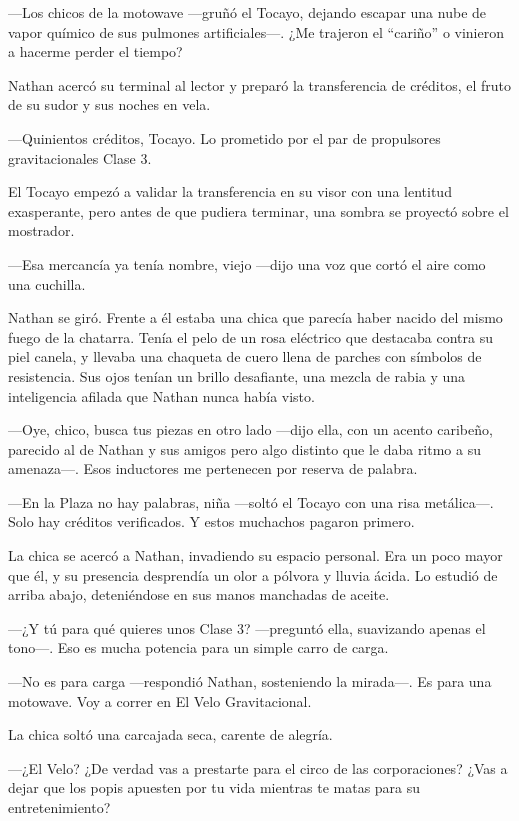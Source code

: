 \documentclass[12pt,a4paper]{book}
\begin{document}
---Los chicos de la motowave ---gruñó el Tocayo, dejando escapar una nube de vapor químico de sus pulmones artificiales---. ¿Me trajeron el ``cariño'' o vinieron a hacerme perder el tiempo?

Nathan acercó su terminal al lector y preparó la transferencia de créditos, el fruto de su sudor y sus noches en vela.

---Quinientos créditos, Tocayo. Lo prometido por el par de propulsores gravitacionales Clase 3.

El Tocayo empezó a validar la transferencia en su visor con una lentitud exasperante, pero antes de que pudiera terminar, una sombra se proyectó sobre el mostrador.

---Esa mercancía ya tenía nombre, viejo ---dijo una voz que cortó el aire como una cuchilla.

Nathan se giró. Frente a él estaba una chica que parecía haber nacido del mismo fuego de la chatarra. Tenía el pelo de un rosa eléctrico que destacaba contra su piel canela, y llevaba una chaqueta de cuero llena de parches con símbolos de resistencia. Sus ojos tenían un brillo desafiante, una mezcla de rabia y una inteligencia afilada que Nathan nunca había visto.

---Oye, chico, busca tus piezas en otro lado ---dijo ella, con un acento caribeño, parecido al de Nathan y sus amigos pero algo distinto que le daba ritmo a su amenaza---. Esos inductores me pertenecen por reserva de palabra.

---En la Plaza no hay palabras, niña ---soltó el Tocayo con una risa metálica---. Solo hay créditos verificados. Y estos muchachos pagaron primero.

La chica se acercó a Nathan, invadiendo su espacio personal. Era un poco mayor que él, y su presencia desprendía un olor a pólvora y lluvia ácida. Lo estudió de arriba abajo, deteniéndose en sus manos manchadas de aceite.

---¿Y tú para qué quieres unos Clase 3? ---preguntó ella, suavizando apenas el tono---. Eso es mucha potencia para un simple carro de carga.

---No es para carga ---respondió Nathan, sosteniendo la mirada---. Es para una motowave. Voy a correr en El Velo Gravitacional.

La chica soltó una carcajada seca, carente de alegría.

---¿El Velo? ¿De verdad vas a prestarte para el circo de las corporaciones? ¿Vas a dejar que los popis apuesten por tu vida mientras te matas para su entretenimiento?
\end{document}

